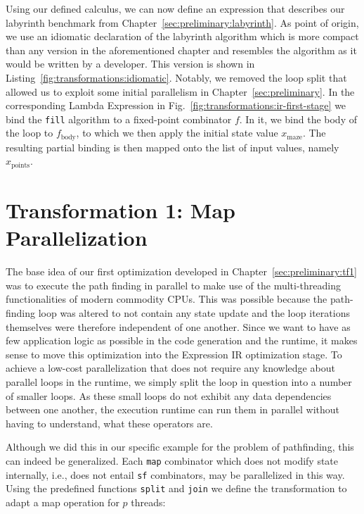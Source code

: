 Using our defined calculus, we can now define an expression that describes our labyrinth benchmark from Chapter~\ref{sec:preliminary:labyrinth}.
As point of origin, we use an idiomatic declaration of the labyrinth algorithm which is more compact than any version in the aforementioned chapter and resembles the algorithm as it would be written by a developer.
This version is shown in Listing~\ref{fig:transformations:idiomatic}.
Notably, we removed the loop split that allowed us to exploit some initial parallelism in Chapter~\ref{sec:preliminary}.
In the corresponding Lambda Expression in Fig.~\ref{fig:transformations:ir-first-stage} we bind the \texttt{fill} algorithm to a fixed-point combinator $f$.
In it, we bind the body of the loop to $f_\text{body}$, to which we then apply the initial state value $x_\text{maze}$.
The resulting partial binding is then mapped onto the list of input values, namely $x_\text{points}$.

\pagebreak

\section{Transformation 1: Map Parallelization}%
\label{sec:transformations:tf1}

The base idea of our first optimization developed in Chapter~\ref{sec:preliminary:tf1} was to execute the path finding in parallel to make use of the multi-threading functionalities of modern commodity CPUs.
This was possible because the path-finding loop was altered to not contain any state update and the loop iterations themselves were therefore independent of one another.
Since we want to have as few application logic as possible in the code generation and the runtime, it makes sense to move this optimization into the Expression IR optimization stage.
To achieve a low-cost parallelization that does not require any knowledge about parallel loops in the runtime, we simply split the loop in question into a number of smaller loops.
As these small loops do not exhibit any data dependencies between one another, the execution runtime can run them in parallel without having to understand, what these operators are.

Although we did this in our specific example for the problem of pathfinding, this can indeed be generalized.
Each \texttt{map} combinator which does not modify state internally, i.e., does not entail \texttt{sf} combinators, may be parallelized in this way.
Using the predefined functions \texttt{split} and \texttt{join} we define the transformation to adapt a map operation for $p$ threads:

